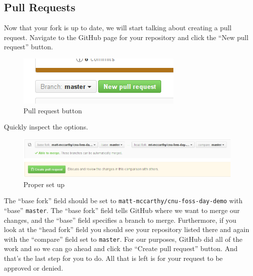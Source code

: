 \documentclass[notitlepage]{simple}
\begin{document}
\subsection{Pull Requests}

Now that your fork is up to date, we will start talking about creating a pull request.
Navigate to the GitHub page for your repository and click the ``New pull request'' button.
\begin{figure}[H]
	\centering
	\includegraphics[scale=0.5]{new-pr.png}
	\caption{Pull request button}
\end{figure}
Quickly inspect the options.
\begin{figure}[H]
	\centering
	\includegraphics[scale=0.5]{pr-setup.png}
	\caption{Proper set up}
\end{figure}
The ``base fork'' field should be set to \verb|matt-mccarthy/cnu-foss-day-demo| with ``base'' \verb|master|.
The ``base fork'' field tells GitHub where we want to merge our changes, and the ``base'' field specifies a branch to merge.
Furthermore, if you look at the ``head fork'' field you should see your repository listed there and again with the ``compare'' field set to \verb|master|.
For our purposes, GitHub did all of the work and so we can go ahead and click the ``Create pull request'' button.
And that's the last step for you to do.
All that is left is for your request to be approved or denied.
\end{document}
